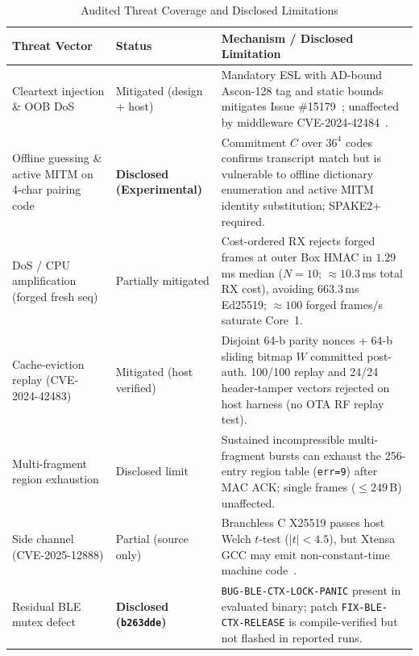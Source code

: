 \documentclass[conference]{IEEEtran}
\renewcommand{\arraystretch}{0.96}
\begin{document}
\begin{table}[t]
\caption{Audited Threat Coverage and Disclosed Limitations}
\label{tab:threat}
\centering\scriptsize
\setlength{\tabcolsep}{2.5pt}
\renewcommand{\arraystretch}{1.05}
\begin{tabularx}{\columnwidth}{@{}>{\raggedright\arraybackslash}p{}>{\raggedright\arraybackslash}p{}>{\raggedright\arraybackslash}X@{}}
\toprule
\textbf{Threat Vector} & \textbf{Status} & \textbf{Mechanism / Disclosed Limitation}\\
\midrule
Cleartext injection \& OOB DoS & Mitigated (design + host) & Mandatory ESL with AD-bound Ascon-128 tag and static bounds mitigates Issue \#15179~\cite{espressif_issue15179}; unaffected by middleware CVE-2024-42484~\cite{nozomi2024}.\\
Offline guessing \& active MITM on 4-char pairing code & \textbf{Disclosed (Experimental)} & Commitment $C$ over $36^4$ codes confirms transcript match but is vulnerable to offline dictionary enumeration and active MITM identity substitution; SPAKE2+~\cite{rfc9383} required.\\
DoS / CPU amplification (forged fresh seq) & Partially mitigated & Cost-ordered RX rejects forged frames at outer Box HMAC in $1.29$\,ms median ($N=10$; $\approx 10.3$\,ms total RX cost), avoiding $663.3$\,ms Ed25519; $\approx 100$ forged frames/s saturate Core~1.\\
Cache-eviction replay (CVE-2024-42483) & Mitigated (host verified) & Disjoint 64-b parity nonces + 64-b sliding bitmap $W$ committed post-auth. 100/100 replay and 24/24 header-tamper vectors rejected on host harness (no OTA RF replay test).\\
Multi-fragment region exhaustion & Disclosed limit & Sustained incompressible multi-fragment bursts can exhaust the 256-entry region table (\texttt{err=9}) after MAC ACK; single frames ($\le 249$\,B) unaffected.\\
Side channel (CVE-2025-12888) & Partial (source only) & Branchless C X25519 passes host Welch $t$-test ($|t|<4.5$), but Xtensa GCC may emit non-constant-time machine code~\cite{cve2025_12888}.\\
Residual BLE mutex defect & \textbf{Disclosed (\texttt{b263dde})} & \texttt{BUG-BLE-CTX-LOCK-PANIC} present in evaluated binary; patch \texttt{FIX-BLE-CTX-RELEASE} is compile-verified but not flashed in reported runs.\\
\bottomrule
\end{tabularx}
\end{table}
\end{document}
